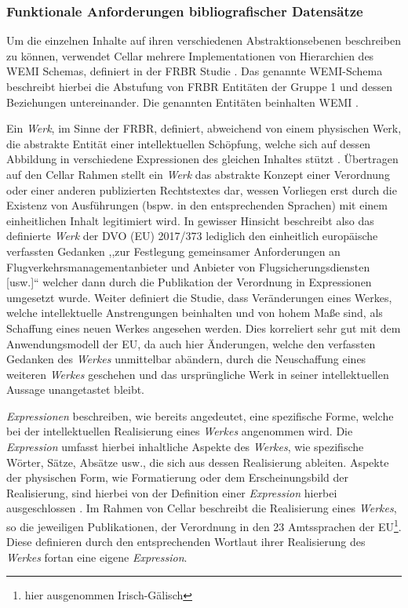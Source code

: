     \subsubsection{Funktionale Anforderungen bibliografischer Datensätze}\label{frbr}
    
Um die einzelnen Inhalte auf ihren verschiedenen Abstraktionsebenen beschreiben zu können, verwendet Cellar mehrere Implementationen von Hierarchien des \acs{WEMI} Schemas, definiert in der \ac{FRBR}  Studie \cite[S. 29f]{eu_cellar}.
Das genannte \acs{WEMI}-Schema beschreibt hierbei die Abstufung von \ac{FRBR} Entitäten der Gruppe 1 und dessen Beziehungen untereinander. 
Die genannten Entitäten beinhalten \ac{WEMI} \cite[12]{eu_frbr}.

Ein \textit{Werk}, im Sinne der \ac{FRBR}, definiert, abweichend von einem physischen Werk, die abstrakte Entität einer intellektuellen Schöpfung, welche sich auf dessen Abbildung in verschiedene Expressionen des gleichen Inhaltes stützt \cite[S. 16f]{eu_frbr}.
Übertragen auf den Cellar Rahmen stellt ein \textit{Werk} das abstrakte Konzept einer Verordnung oder einer anderen publizierten Rechtstextes dar, wessen Vorliegen erst durch die Existenz von Ausführungen (bspw. in den entsprechenden Sprachen) mit einem einheitlichen Inhalt legitimiert wird. 
In gewisser Hinsicht beschreibt also das definierte \textit{Werk} der \acs{DVO} (\acs{EU}) 2017/373 lediglich den einheitlich europäische verfassten Gedanken ,,zur Festlegung gemeinsamer Anforderungen an Flugverkehrsmanagementanbieter und Anbieter von Flugsicherungsdiensten [usw.]`` welcher dann durch die Publikation der Verordnung in Expressionen umgesetzt wurde.
Weiter definiert die Studie, dass Veränderungen eines Werkes, welche intellektuelle Anstrengungen beinhalten und von hohem Maße sind, als Schaffung eines neuen Werkes angesehen werden. \cite[17]{eu_frbr} 
Dies korreliert sehr gut mit dem Anwendungsmodell der \ac{EU}, da auch hier Änderungen, welche den verfassten Gedanken des \textit{Werkes} unmittelbar abändern, durch die Neuschaffung eines weiteren \textit{Werkes} geschehen und das ursprüngliche Werk in seiner intellektuellen Aussage unangetastet bleibt.


\textit{Expressionen} beschreiben, wie bereits angedeutet, eine spezifische Forme, welche bei der intellektuellen Realisierung eines \textit{Werkes} angenommen wird.
Die \textit{Expression} umfasst hierbei inhaltliche Aspekte des \textit{Werkes}, wie spezifische Wörter, Sätze, Absätze usw., die sich aus dessen Realisierung ableiten. 
Aspekte der physischen Form, wie Formatierung oder dem Erscheinungsbild der Realisierung, sind hierbei von der Definition einer \textit{Expression} hierbei ausgeschlossen \cite[S. 18f]{eu_frbr}.
Im Rahmen von Cellar beschreibt die Realisierung eines \textit{Werkes}, so die jeweiligen Publikationen, der Verordnung in den 23 Amtssprachen der EU\footnote{hier ausgenommen Irisch-Gälisch}.
Diese definieren durch den entsprechenden Wortlaut ihrer Realisierung des \textit{Werkes} fortan eine eigene \textit{Expression}.

